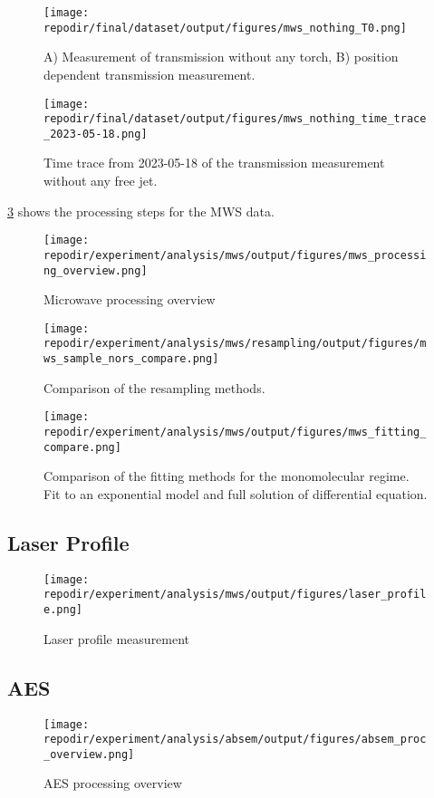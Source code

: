 \begin{figure}[]
\centering
\texttt{[image: \\repodir/final/dataset/output/figures/mws\_nothing\_T0.png]}
\caption{A) Measurement of transmission without any torch, B) position dependent transmission measurement.}
\label{fig:SI_MWS}
\end{figure}


\begin{figure}[]
\centering
\texttt{[image: \\repodir/final/dataset/output/figures/mws\_nothing\_time\_trace\_2023-05-18.png]}
\caption{Time trace from 2023-05-18 of the transmission measurement without any free jet.}
\label{fig:SI_MWS}
\end{figure}

\ref{fig:SI_mws_processing_overview} shows the processing steps for the MWS data. 



\begin{figure}[]
\centering
\texttt{[image: \\repodir/experiment/analysis/mws/output/figures/mws\_processing\_overview.png]}
\caption{Microwave processing overview}
\label{fig:SI_mws_processing_overview}
\end{figure}

\begin{figure}
\centering
\texttt{[image: \\repodir/experiment/analysis/mws/resampling/output/figures/mws\_sample\_nors\_compare.png]}
\caption{Comparison of the resampling methods.}
\label{fig:SI_mws_resampling}
\end{figure}


\begin{figure}
\centering
\texttt{[image: \\repodir/experiment/analysis/mws/output/figures/mws\_fitting\_compare.png]}
\caption{Comparison of the fitting methods for the monomolecular regime. Fit to an exponential model and full solution of differential equation. }
\label{fig:SI_mws_fitting_compare}
\end{figure}

\clearpage
\subsection{Laser Profile}


\begin{figure}[H]
\centering
\texttt{[image: \\repodir/experiment/analysis/mws/output/figures/laser\_profile.png]}
\caption{Laser profile measurement}
\label{fig:SI_Laser_Profile}
\end{figure}

\clearpage
\subsection{AES}
\begin{figure}[]
    \centering
    \texttt{[image: \\repodir/experiment/analysis/absem/output/figures/absem\_proc\_overview.png]}
    \caption{AES processing overview}
    \label{fig:SI_AES_proc_overview}
\end{figure}
